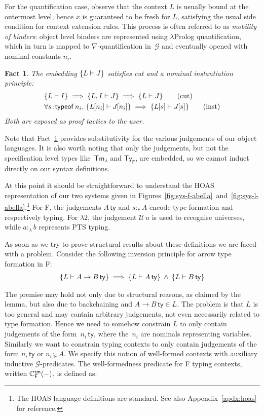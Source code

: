 \documentclass[a4paper,UKenglish]{lipics-v2016}
\newcommand{\ms}{\,}
\newcommand{\mrel}[1]{\mathrel{\ms #1 \ms}}
\newcommand{\mAnd}{\mrel{\wedge}}
\newcommand{\mAll}[1]{\ensuremath{\forall} #1.\ms\ms}
\newcommand{\SysL}{$\lambda2$\xspace}
\newcommand{\TyF}{\ensuremath{\mathsf{Ty_{F}}}}
\newcommand{\TmL}{\ensuremath{\mathsf{Tm_{\lambda}}}}
\newcommand{\of}{\ensuremath{\!:\!}}
\newcommand{\istyFh}[1]{\ensuremath{#1\ms\mathsf{ty}}}
\newcommand{\typingFh}[2]{\ensuremath{#1 \mathbin{:_{\mathsf{F}}} #2}}
\newcommand{\sortLh}[1]{\ensuremath{\mathcal{U}\ms#1}}
\newcommand{\typingLh}[2]{\ensuremath{#1 \mathbin{:_{\lambda}} #2}}
\newcommand{\subst}[1]{\hphantom{|}\!\![{#1}]}
\theoremstyle{plain}
\newtheorem{fact}[theorem]{Fact}
\begin{document}
For the quantification case, observe that the context $L$ is usually bound at the outermost level, hence $x$ is guaranteed to be fresh for $L$, satisfying the usual side condition for context extension rules.
This process is often referred to as \emph{mobility of binders}: object level binders are represented using $\lambda$Prolog quantification, which in turn is mapped to $\nabla$-quantification in~$\mathcal{G}$ and eventually opened with nominal constants $n_i$.
\begin{fact}
  \label{fac:ab-cut-inst}
  The embedding $\{L \vdash J\}$ satisfies cut and a nominal instantiation principle:
  \begin{align*}
    &\aj{L}{I} \implies \aj{L,I}{J} \implies \aj{L}{J} \tag{cut} \\
    &\mAll{s \of \mathsf{typeof}\, n_i} \aj{L\subst{n_i}}{J\subst{n_i}} \implies \aj{L\subst{s}}{J\subst{s}} \tag{inst}
  \end{align*}
  Both are exposed as proof tactics to the user.\hfill\qedsymbol
\end{fact}
Note that Fact~\ref{fac:ab-cut-inst} provides substitutivity for the various judgements of our object languages.
It is also worth noting that only the judgements, but not the specification level types like~$\TmL$ and $\TyF$, are embedded, so we cannot induct directly on our syntax definitions.

At this point it should be straightforward to understand the HOAS representation of our two systems given in Figures~\ref{fig:sys-f-abella}~and~\ref{fig:sys-l-abella}.\footnote{The HOAS language definitions are standard. See also Appendix~\ref{apdx:hoas} for reference.}
For F, the judgements $\istyFh{A}$ and $\typingFh{s}{A}$ encode type formation and respectively typing.
For \SysL, the judgement $\sortLh{u}$ is used to recognise universes, while $\typingLh{a}{b}$ represents PTS typing.

As soon as we try to prove structural results about these definitions we are faced with a problem.
Consider the following inversion principle for arrow type formation in F:
\begin{align*}
  \aj{L}{\istyFh{A \to B}} \implies \aj{L}{\istyFh{A}} \mAnd \aj{L}{\istyFh{B}}
\end{align*}

The premise may hold not only due to structural reasons, as claimed by the lemma, but also due to backchaining and $\istyFh{A \to B} \in L$.
The problem is that $L$ is too general and may contain arbitrary judgements, not even necessarily related to type formation.
Hence we need to somehow constrain $L$ to only contain judgements of the form~$\istyFh{n_i}$, where the~$n_i$ are nominals representing variables.
Similarly we want to constrain typing contexts to only contain judgements of the form $\istyFh{n_i}$ or $\typingFh{n_i}{A}$.
We specify this notion of well-formed contexts  with auxiliary inductive $\mathcal{G}$-predicates.
The well-formedness predicate for F typing contexts, written $\mathbb{C}_{\mathsf{F}}^{\mathsf{tm}} (-)$, is defined as:
\end{document}
